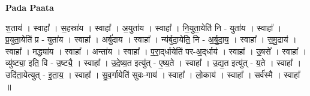 \documentclass[17pt]{extarticle}
\begin{document}
\textbf{Pada Paata} \newline

श॒ताय॑ । स्वाहा᳚ । स॒हस्रा॑य । स्वाहा᳚ । अ॒युता॑य । स्वाहा᳚ । नि॒युता॒येति॑ नि - युता॑य । स्वाहा᳚ । प्र॒युता॒येति॑ प्र - युता॑य । स्वाहा᳚ । अर्बु॑दाय । स्वाहा᳚ । न्य॑र्बुदा॒येति॒ नि - अ॒र्बु॒दा॒य॒ । स्वाहा᳚ । स॒मु॒द्राय॑ । स्वाहा᳚ । मद्ध्या॑य । स्वाहा᳚ । अन्ता॑य । स्वाहा᳚ । प॒रा॒द्‌र्धायेति॑ पर-अ॒द्‌र्धाय॑ । स्वाहा᳚ । उ॒षसे᳚ । स्वाहा᳚ । व्यु॑ष्ट्या॒ इति॒ वि - उ॒ष्ट्यै॒ । स्वाहा᳚ । उ॒दे॒ष्य॒त इत्यु॑त् - ए॒ष्य॒ते । स्वाहा᳚ । उ॒द्य॒त इत्यु॑त् - य॒ते । स्वाहा᳚ । उदि॑ता॒येत्युत् - इ॒ता॒य॒ । स्वाहा᳚ । सु॒व॒र्गायेति॑ सुवः-गाय॑ । स्वाहा᳚ । लो॒काय॑ । स्वाहा᳚ । सर्व॑स्मै । स्वाहा᳚ ॥  \newline
\end{document}
